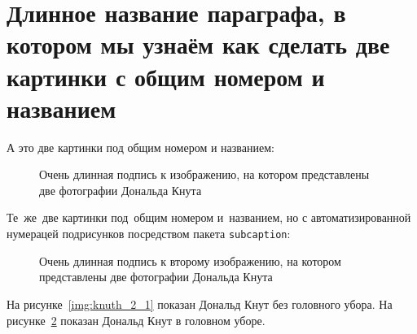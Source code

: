\section{Длинное название параграфа, в котором мы узнаём как сделать две картинки с общим номером и названием} \label{sect2_2}

А это две картинки под общим номером и названием:
\begin{figure}[ht]
  \begin{minipage}[ht]{0.49\linewidth}
  \end{minipage}
  \hfill
  \begin{minipage}[ht]{0.49\linewidth}
  \end{minipage}
  \caption{Очень длинная подпись к изображению, на котором представлены две фотографии Дональда Кнута}
  \label{img:knuth}  
\end{figure}

Те~же~две картинки под~общим номером и~названием, но с автоматизированной нумерацей подрисунков посредством пакета \verb|subcaption|:
\begin{figure}[ht]
    
    \caption{Очень длинная подпись к второму изображению, на котором представлены две фотографии Дональда Кнута} %
    \label{img:knuth_2}  
\end{figure}


На рисунке~\ref{img:knuth_2_1} показан Дональд Кнут без головного убора. На рисунке~\ref{img:knuth_2}  показан Дональд Кнут в головном уборе.

